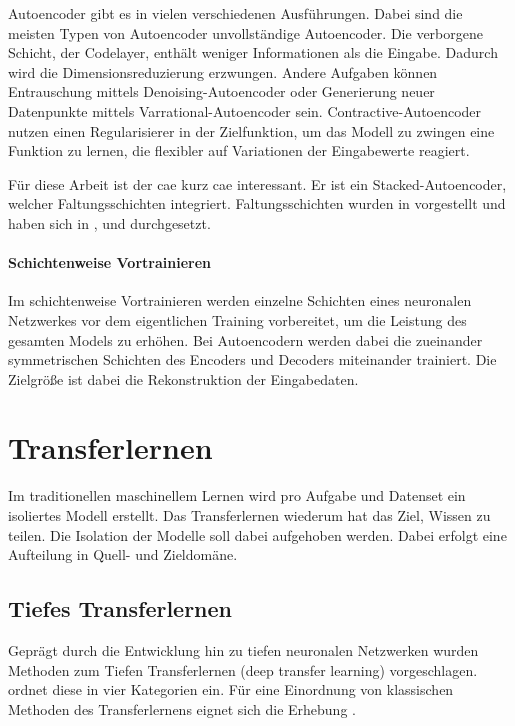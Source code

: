 	Autoencoder gibt es in vielen verschiedenen Ausführungen. Dabei sind die meisten Typen von Autoencoder unvollständige Autoencoder. Die verborgene Schicht, der Codelayer, enthält weniger Informationen als die Eingabe. Dadurch wird die Dimensionsreduzierung erzwungen. Andere Aufgaben können Entrauschung mittels Denoising-Autoencoder \cite{Vincent.2008} oder Generierung neuer Datenpunkte mittels Varrational-Autoencoder \cite{Kingma.2019} sein. Contractive-Autoencoder \cite{Rifai.2011} nutzen einen Regularisierer in der Zielfunktion, um das Modell zu zwingen eine Funktion zu lernen, die flexibler auf Variationen der Eingabewerte reagiert.   	

	Für diese Arbeit ist der \acl{cae} \cite{Masci.2011} kurz \ac{cae} interessant. Er ist ein Stacked-Autoencoder, welcher Faltungsschichten integriert. Faltungsschichten wurden in \cite{LeCun.1999} vorgestellt und haben sich in \cite{Krizhevsky.2012}, \cite{ChristianSzegedy.2014} und \cite{LeCun.2015} durchgesetzt. 
		
	\paragraph{Schichtenweise Vortrainieren} Im schichtenweise Vortrainieren \cite{Bengio.2007} werden einzelne Schichten eines neuronalen Netzwerkes vor dem eigentlichen Training vorbereitet, um die Leistung des gesamten Models zu erhöhen. Bei Autoencodern werden dabei die zueinander symmetrischen Schichten des Encoders und Decoders miteinander trainiert. Die Zielgröße ist dabei die Rekonstruktion der Eingabedaten.    

	\section{ Transferlernen}
	\label{sec:Transferlernen}
	Im traditionellen maschinellem Lernen wird pro Aufgabe und Datenset ein isoliertes Modell erstellt. Das Transferlernen wiederum hat das Ziel, Wissen zu teilen. Die Isolation der Modelle soll dabei aufgehoben werden. Dabei erfolgt eine Aufteilung in Quell- und Zieldomäne.
	
		\subsection{Tiefes Transferlernen}
		Geprägt durch die Entwicklung hin zu tiefen neuronalen Netzwerken wurden Methoden zum Tiefen Transferlernen (deep transfer learning) vorgeschlagen. \cite{Tan.2018} ordnet diese in vier Kategorien ein. Für eine Einordnung von klassischen Methoden des Transferlernens eignet sich die Erhebung \cite{FuzhenZhuang.2019}.
		 
